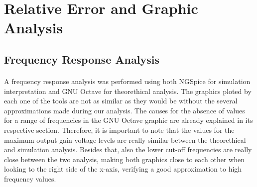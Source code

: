 \section{Relative Error and Graphic Analysis}
\label{error}

\subsection{Frequency Response Analysis}
\label{subsec:freqresp}

\paragraph{}
A frequency response analysis was performed using both NGSpice for simulation interpretation and GNU Octave for theorethical analysis. The graphics ploted by each one of the tools are not as similar as they would be without the several approximations made during our analysis. The causes for the absence of values for a range of frequencies in the GNU Octave graphic are already explained in its respective section. Therefore, it is important to note that the values for the maximum output gain voltage levels are really similar between the theorethical and simulation analysis. Besides that, also the lower cut-off frequencies are really close between the two analysis, making both graphics close to each other when looking to the right side of the x-axis, verifying a good approximation to high frequency values. 

